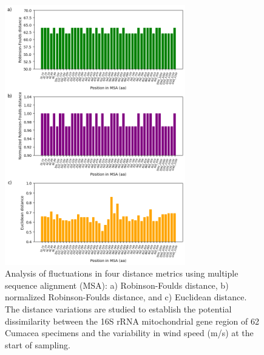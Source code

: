 {\begin{figure}[]
    \centering
    \includegraphics[width=0.7\textwidth]{figure5.png}
     \caption{Analysis of fluctuations in four distance metrics using multiple sequence alignment (MSA): a) Robinson-Foulds distance, b) normalized Robinson-Foulds distance, and c) Euclidean distance. The distance variations are studied to establish the potential dissimilarity between the 16S rRNA mitochondrial gene region of 62 Cumacea specimens and the variability in wind speed (m/s) at the start of sampling. \label{fig:fig6}}
\end{figure}

}
